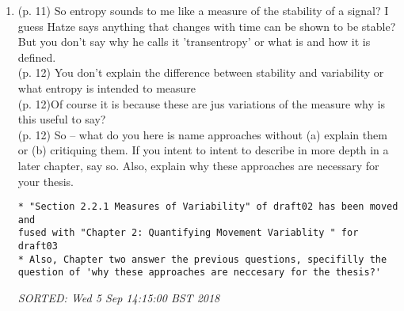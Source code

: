 \documentclass[10pt]{article}
\begin{document}
\begin{enumerate}[noitemsep,topsep=0pt]
\item (p. 11) So entropy sounds to me like a measure of the stability 
	of a signal?
	I guess Hatze says anything that changes with time can be shown 
	to be stable?
	But you don't say why he calls it 'transentropy'
	or what is and how it is defined. 
\\ (p. 12) You don't explain the difference between stability and variability
	or what entropy is intended to measure
	\\ (p. 12)Of course it is because these are jus variations of the measure 
	why is this useful to say? 
	\\ (p. 12) So -- what do you here is name approaches without 
	(a) explain them or 
	(b) critiquing them.
	If you intent to intent to describe in more depth in a later chapter, say so.
	Also, explain why these approaches are necessary for 
	your thesis.
	
\begin{verbatim}
* "Section 2.2.1 Measures of Variability" of draft02 has been moved and 
fused with "Chapter 2: Quantifying Movement Variablity " for draft03
* Also, Chapter two answer the previous questions, specifilly the
question of 'why these approaches are neccesary for the thesis?'
\end{verbatim} 
\textit{
SORTED: Wed  5 Sep 14:15:00 BST 2018
}
\\








\end{enumerate}
\end{document}
